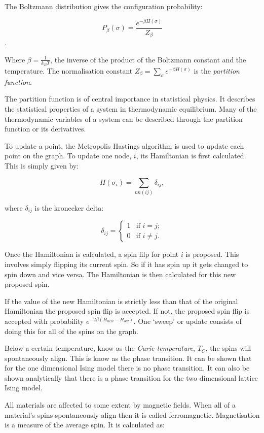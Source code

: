 \documentclass[pdftex,12pt,a4paper]{article}
\begin{document}
The Boltzmann distribution gives the configuration probability:

\[ P_{\beta}(\sigma) = \frac{e^{-\beta H(\sigma)}}{Z_{\beta}} \].

Where $\beta = \frac{1}{k_B T}$, the inverse of the product of the Boltzmann constant and the temperature. The normalisation constant $Z_{\beta} = \sum_{\sigma} e^{-\beta H(\sigma)}$ is the \emph{partition function}.

The partition function is of central importance in statistical physics. It describes the statistical properties of a system in thermodynamic equilibrium. Many of the thermodynamic variables of a system can be described through the partition function or its derivatives.

To update a point, the Metropolis Hastings algorithm is used to update each point on the graph. To update one node, $i$, its Hamiltonian is first calculated. This is simply given by:

\[ H(\sigma_i) = \sum_{nn(ij)} \delta_{ij}, \]

where $\delta_{ij}$ is the kronecker delta: 

\[ \delta_{ij} = \left\{ \begin{array}{ll}
         1 & \mbox{if $i = j$};\\
        0 & \mbox{if $i \neq j$}.\end{array} \right. \]

Once the Hamiltonian is calculated, a spin filp for point $i$ is proposed. This involves simply flipping its current spin. So if it has spin up it gets changed to spin down and vice versa. The Hamiltonian is then calculated for this new proposed spin.

If the value of the new Hamiltonian is strictly less than that of the original Hamiltonian the proposed spin flip is accepted. If not, the proposed spin flip is accepted with probability $e^{-2 \beta (H_{new} - H_{old})}$. One `sweep' or update consists of doing this for all of the spins on the graph.

Below a certain temperature, know as the \emph{Curie temperature}, $T_C$, the spins will spontaneously align. This is know as the phase transition. It can be shown that for the one dimensional Ising model there is no phase transition. It can also be shown analytically that there is a phase transition for the two dimensional lattice Ising model.

All materials are affected to some extent by magnetic fields. When all of a material's spins spontaneously align then it is called ferromagnetic. Magnetisation is a measure of the average spin. It is calculated as:
\end{document}
